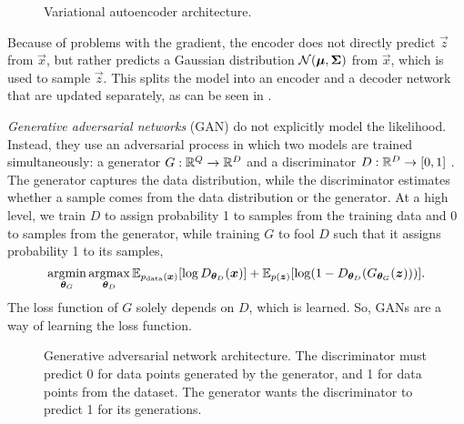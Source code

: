 \begin{figure}[ht]
    \centering
    \caption{Variational autoencoder architecture.}
    \label{fig:variational-autoencoder}
\end{figure}

Because of problems with the gradient, the encoder does not directly predict
$\vec{z}$ from $\vec{x}$, but rather predicts a Gaussian distribution
$\mathcal{N}(\bm{\mu},\bm{\Sigma})$ from $\vec{x}$, which is used to sample
$\vec{z}$. This splits the model into an encoder and a decoder network that are
updated separately, as can be seen in .

\textit{Generative adversarial networks} (GAN) do not explicitly model the
likelihood. Instead, they use an adversarial process in which two models are
trained simultaneously: a generator $G: \mathbb{R}^Q\to\mathbb{R}^D$ and a discriminator
$D:\mathbb{R}^D \to [0,1]$ \citep{goodfellow2014generative}. The generator captures the
data distribution, while the discriminator estimates whether a sample comes
from the data distribution or the generator. At a high level, we train $D$ to
assign probability 1 to samples from the training data and 0 to samples from
the generator, while training $G$ to fool $D$ such that it assigns probability
1 to its samples, \[
    \argmin_{\vec{\theta}_G}\argmax_{\vec{\theta}_D} \E_{p_{\text{data}}(\bm{x})}[\log D_{\vec{\theta}_D}(\vec{x})] + \E_{p(\vec{z})} \lft[ \log (1-D_{\vec{\theta}_D}(G_{\vec{\theta}_G}(\vec{z}))) \rgt].
\]
The loss function of $G$ solely depends on $D$, which is learned. So, GANs
are a way of learning the loss function.

\begin{figure}[ht]
    \centering
    \caption{Generative adversarial network architecture. The discriminator must
        predict 0 for data points generated by the generator, and 1 for data points
        from the dataset. The generator wants the discriminator to predict 1 for its
        generations.}
    \label{fig:gan}
\end{figure}
